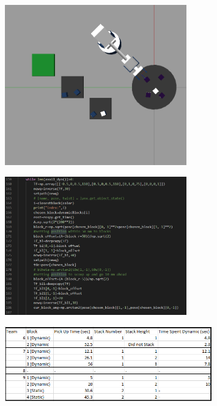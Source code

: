 \documentclass{article}
\begin{document}
\begin{figure}[h]
\centering
\includegraphics[width=0.7\textwidth]{Dynamic_pickup.png}
\caption{}
\label{dyn}
\end{figure}

\begin{figure}[h]
\centering
\includegraphics[width=0.7\textwidth]{dynamic_alg.png}
\caption{}
\label{dyn_alg}
\end{figure}

\begin{figure}[h]
\centering
\includegraphics[width=0.8\textwidth]{Data_Competitions.png}
\caption{}
\label{data}
\end{figure}
\end{document}
